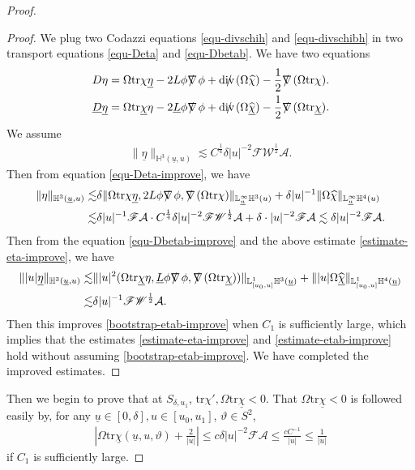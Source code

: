 \documentclass[11pt,reqno]{amsart}
\theoremstyle{definition}
\numberwithin{equation}{section}
\newcommand{\tr}{\mathrm{tr}}
\renewcommand{\L}{\mathbb{L}}
\renewcommand{\H}{\mathbb{H}}
\def\chib{\underline{\chi}}
\def\chibh{\widehat{\underline{\chi}}}
\def\chih{\widehat{\chi}}
\def\etab{\underline{\eta}}
\def\Lb{\underline{L}}
\def\tr{\mathrm{tr}}
\def\ub{\underline{u}}
\newcommand{\Db}{\underline{D}}
\def\nablas{\mbox{$\nabla \mkern -13mu /$ }}
\def\divs{\mbox{$\mathrm{div} \mkern -13mu /$ }}
\begin{document}
\begin{proof}
\begin{proof}
We plug two Codazzi equations \eqref{equ-divschih} and \eqref{equ-divschibh} in two transport equations \eqref{equ-Deta} and \eqref{equ-Dbetab}. We have two equations
\begin{align}\label{equ-Deta-improve}
D\eta = \Omega\tr\chi\etab-2L\phi\nablas\phi+\divs(\Omega\chih)-\frac{1}{2}\nablas(\Omega\tr \chi).\\
\label{equ-Dbetab-improve}\Db\etab = \Omega\tr\chib\eta-2\Lb\phi\nablas\phi+\divs(\Omega\chibh)-\frac{1}{2}\nablas(\Omega\tr \chib).
\end{align}
We assume 
\begin{align}\label{bootstrap-etab-improve}
\|\etab\|_{\H^3(\ub,u)}\lesssim C^{\frac{1}{4}}\delta|u|^{-2}\mathscr{F}\mathscr{W}^{\frac{1}{2}}\mathcal{A}.
\end{align}
Then from equation \eqref{equ-Deta-improve}, we have
\begin{equation}\label{estimate-eta-improve}
\begin{split}
\|\eta\|_{\H^3(\ub,u)}\lesssim&\delta\|\Omega\tr\chi\etab,2L\phi\nablas\phi,\nablas(\Omega\tr\chi)\|_{\L^\infty_{\ub}\H^3(u)}+\delta|u|^{-1}\|\Omega\chih\|_{\L^\infty_{\ub}\H^4(u)}\\
\lesssim&\delta|u|^{-1}\mathscr{F}\mathcal{A}\cdot C^{\frac{1}{4}}\delta|u|^{-2}\mathscr{F}\mathscr{W}^{\frac{1}{2}}\mathcal{A}+\delta\cdot|u|^{-2}\mathscr{F}\mathcal{A}\lesssim\delta|u|^{-2}\mathscr{F}\mathcal{A}.
\end{split}
\end{equation}
Then from the equation \eqref{equ-Dbetab-improve} and the above estimate \eqref{estimate-eta-improve}, we have
\begin{equation}\label{estimate-etab-improve}
\begin{split}
\||u|\etab\|_{\H^3(\ub,u)}\lesssim&\||u|^2(\Omega\tr\chib\eta,\Lb\phi\nablas\phi,\nablas(\Omega\tr\chib))\|_{\L^1_{[u_0,u]}\H^3(\ub)}+\||u|\Omega\chibh\|_{\L^1_{[u_0,u]}\H^4(\ub)}\\
\lesssim&\delta|u|^{-1}\mathscr{F}\mathscr{W}^{\frac{1}{2}}\mathcal{A}.
\end{split}
\end{equation}
Then this improves \eqref{bootstrap-etab-improve} when $C_1$ is sufficiently large, which implies that the estimates \eqref{estimate-eta-improve} and \eqref{estimate-etab-improve} hold without assuming \eqref{bootstrap-etab-improve}. We have completed the improved estimates.

\end{proof}
Then we begin to prove that at $S_{\delta,u_1}$, $\tr\chi', \Omega\tr\chib<0$. That $\Omega\tr\chib<0$ is followed easily by, for any $\ub\in[0,\delta], u\in[u_0,u_1]$, $\vartheta\in S^2$,
\begin{align*}
\left|\Omega\tr\chib(\ub,u,\vartheta)+\frac{2}{|u|}\right|\le c\delta|u|^{-2}\mathscr{F}\mathcal{A}\le\frac{cC^{-1}}{|u|}\le\frac{1}{|u|}
\end{align*}
if $C_1$ is sufficiently large.


\end{proof}
\end{document}
